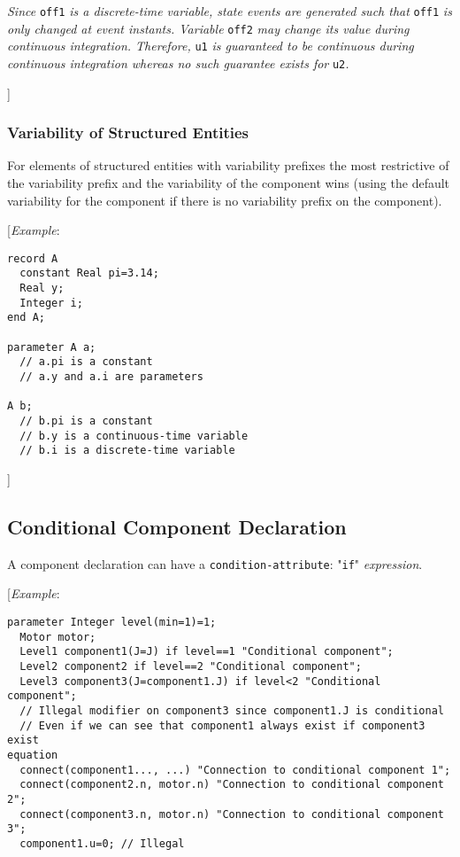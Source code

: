 \emph{Since} \lstinline!off1! \emph{is a discrete-time variable, state events are
generated such that} \lstinline!off1! \emph{is only changed at event instants.
Variable} \lstinline!off2! \emph{may change its value during continuous integration.
Therefore,} \lstinline!u1! \emph{is guaranteed to be continuous during continuous
integration whereas no such guarantee exists for} \lstinline!u2!\emph{.}

{]}

\subsubsection{Variability of Structured Entities}

For elements of structured entities with variability prefixes the most
restrictive of the variability prefix and the variability of the
component wins (using the default variability for the component if there
is no variability prefix on the component).

{[}\emph{Example}:
\begin{lstlisting}[language=modelica]
record A
  constant Real pi=3.14;
  Real y;
  Integer i;
end A;

parameter A a;
  // a.pi is a constant
  // a.y and a.i are parameters
  
A b;
  // b.pi is a constant
  // b.y is a continuous-time variable
  // b.i is a discrete-time variable
\end{lstlisting}

{]}

\subsection{Conditional Component Declaration}

A component declaration can have a \lstinline!condition-attribute!: "\lstinline!if!"
\emph{expression}.

{[}\emph{Example}:
\begin{lstlisting}[language=modelica]
  parameter Integer level(min=1)=1;
  Motor motor;
  Level1 component1(J=J) if level==1 "Conditional component";
  Level2 component2 if level==2 "Conditional component";
  Level3 component3(J=component1.J) if level<2 "Conditional component";
  // Illegal modifier on component3 since component1.J is conditional
  // Even if we can see that component1 always exist if component3 exist
equation
  connect(component1..., ...) "Connection to conditional component 1";
  connect(component2.n, motor.n) "Connection to conditional component 2";
  connect(component3.n, motor.n) "Connection to conditional component 3";
  component1.u=0; // Illegal
\end{lstlisting}

